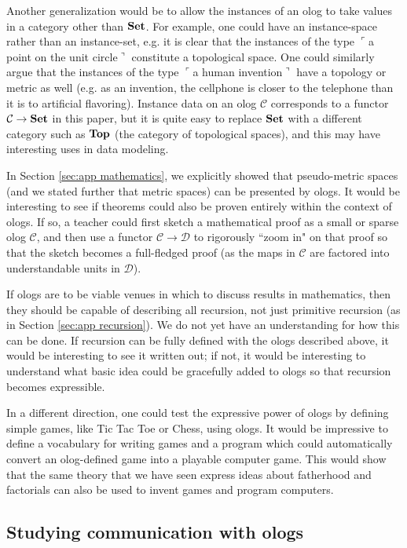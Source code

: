 \documentclass{amsart}
\def\to{\rightarrow}
\def\Set{{\bf Set}}
\def\mcC{{\mathcal C}}
\def\mcD{{\mathcal D}}
\newcommand{\fakebox}[1]{\tn{$\ulcorner$#1$\urcorner$}}
\theoremstyle{remark}
\theoremstyle{definition}
\def\tn{\textnormal}
\begin{document}
Another generalization would be to allow the instances of an olog to take values in a category other than $\Set$. For example, one could have an instance-space rather than an instance-set, e.g. it is clear that the instances of the type \fakebox{a point on the unit circle} constitute a topological space. One could similarly argue that the instances of the type \fakebox{a human invention} have a topology or metric as well (e.g. as an invention, the cellphone is closer to the telephone than it is to artificial flavoring).  Instance data on an olog $\mcC$ corresponds to a functor $\mcC\to\Set$ in this paper, but it is quite easy to replace $\Set$ with a different category such as ${\bf Top}$ (the category of topological spaces), and this may have interesting uses in data modeling.

In Section \ref{sec:app mathematics}, we explicitly showed that pseudo-metric spaces (and we stated further that metric spaces) can be presented by ologs. It would be interesting to see if theorems could also be proven entirely within the context of ologs. If so, a teacher could first sketch a mathematical proof as a small or sparse olog $\mcC$, and then use a functor $\mcC\to\mcD$ to rigorously ``zoom in" on that proof so that the sketch becomes a full-fledged proof (as the maps in $\mcC$ are factored into understandable units in $\mcD$). 

If ologs are to be viable venues in which to discuss results in mathematics, then they should be capable of describing all recursion, not just primitive recursion (as in Section \ref{sec:app recursion}). We do not yet have an understanding for how this can be done. If recursion can be fully defined with the ologs described above, it would be interesting to see it written out; if not, it would be interesting to understand what basic idea could be gracefully added to ologs so that recursion becomes expressible.

In a different direction, one could test the expressive power of ologs by defining simple games, like Tic Tac Toe or Chess, using ologs. It would be impressive to define a vocabulary for writing games and a program which could automatically convert an olog-defined game into a playable computer game. This would show that the same theory that we have seen express ideas about fatherhood and factorials can also be used to invent games and program computers.

\subsection{Studying communication with ologs}\label{sec:studying comm}
\end{document}
